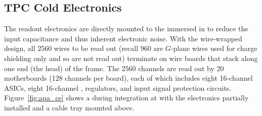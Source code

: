 \subsection{TPC Cold Electronics}
\label{sec:fdsp-apa-intfc-elec}

The  readout electronics are directly mounted to the  immersed in  to reduce the input capacitance and thus inherent electronic noise.  With the wire-wrapped design, all \num{2560} wires to be read out (recall \num{960} are $G$-plane wires used for charge shielding only and so are not read out) terminate on wire boards that stack along one end (the head) of the  frame.  The \num{2560} channels are read out by \num{20}  motherboards (\num{128} channels per board), each of which includes eight \num{16}-channel  ASICs, eight \num{16}-channel  ,  regulators, and input signal protection circuits.  Figure~\ref{fig:apa_ce} shows a   during integration at  with the  electronics partially installed and a cable tray mounted above. 

